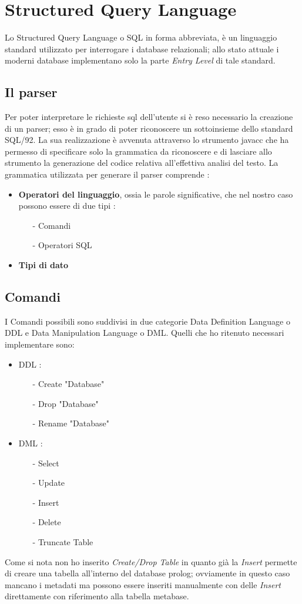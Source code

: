 \section{Structured Query Language}

Lo Structured Query Language o SQL in forma abbreviata, è un linguaggio standard utilizzato per interrogare i database relazionali; allo stato attuale i moderni database implementano solo la parte \emph{Entry Level} di tale standard. 

\subsection{Il parser}
Per poter interpretare le richieste sql dell'utente si è reso necessario la creazione di un parser; esso è in grado di poter riconoscere un sottoinsieme dello standard SQL/92. La sua realizzazione è avvenuta attraverso lo strumento javacc che ha permesso di specificare solo la grammatica da riconoscere e di lasciare allo strumento la generazione del codice relativa all'effettiva analisi del testo. La grammatica utilizzata per generare il parser comprende :
\begin{itemize}
\item {\bf Operatori del linguaggio}, ossia le parole significative, che nel nostro caso possono essere di due tipi : 
\begin{itemize}
\item[-] Comandi
\item[-] Operatori SQL
\end{itemize}
\item {\bf Tipi di dato}
\end{itemize}

\subsection{Comandi}
I Comandi possibili sono suddivisi in due categorie Data Definition Language o DDL e Data Manipulation Language o DML. Quelli che ho ritenuto necessari implementare sono:
\begin{itemize}
\item DDL :
\begin{itemize}
\item[-] Create "Database"
\item[-] Drop "Database"
\item[-] Rename "Database"
\end{itemize}
\item DML :
\begin{itemize}
\item[-] Select
\item[-] Update
\item[-] Insert 
\item[-] Delete
\item[-] Truncate Table
\end{itemize}
\end{itemize}
Come si nota non ho inserito \emph{Create/Drop Table} in quanto già la \emph{Insert} permette di creare una tabella all'interno del database prolog; ovviamente in questo caso mancano i metadati ma possono essere inseriti manualmente con delle \emph{Insert} direttamente con riferimento alla tabella metabase. 

